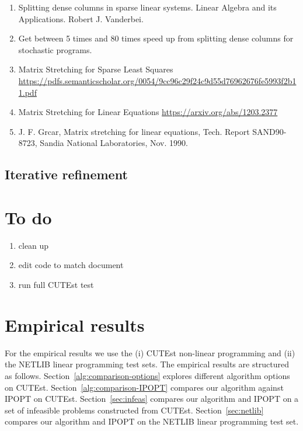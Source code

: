 \documentclass{article}
\begin{document}
\begin{enumerate}
\item Splitting dense columns in sparse linear systems. Linear Algebra and its Applications. Robert J. Vanderbei. \cite{vanderbei1991splitting}
\item \cite{lustig1991formulating} Get between 5 times and 80 times speed up from splitting dense columns for stochastic programs.
\item Matrix Stretching for Sparse Least Squares \url{https://pdfs.semanticscholar.org/0054/9cc96c29f24c9d55d76962676fe5993f2b11.pdf}
\item Matrix Stretching for Linear Equations \url{https://arxiv.org/abs/1203.2377}
\item J. F. Grcar, Matrix stretching for linear equations, Tech. Report SAND90-8723, Sandia
National Laboratories, Nov. 1990.
\end{enumerate}

\subsection{Iterative refinement}


\section{To do}

\begin{enumerate}
\item clean up 
\item edit code to match document
\item run full CUTEst test
\end{enumerate}

\section{Empirical results}\label{sec:empirical-results}

For the empirical results we use the (i) CUTEst non-linear programming and (ii) the NETLIB linear programming test sets. The empirical results are structured as follows. Section~\ref{alg:comparison-options} explores different algorithm options on CUTEst.  Section~\ref{alg:comparison-IPOPT} compares our algorithm against IPOPT on CUTEst. Section~\ref{sec:infeas} compares our algorithm and IPOPT on a set of infeasible problems constructed from CUTEst. Section~\ref{sec:netlib} compares our algorithm and IPOPT on the NETLIB linear programming test set.
\end{document}
